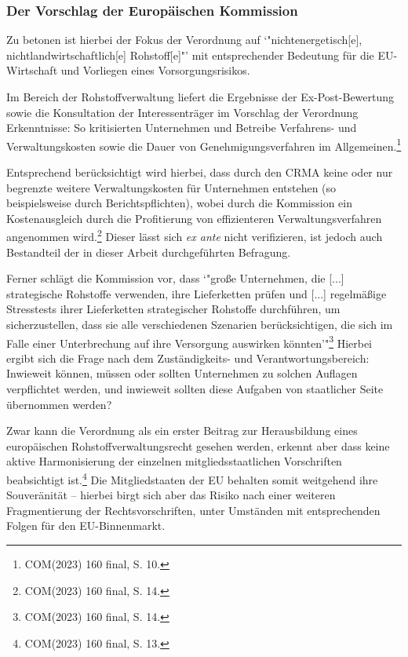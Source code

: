 \documentclass[12pt,a4paper,oneside]{book} %
\begin{document}
{	\subsubsection{Der Vorschlag der Europäischen Kommission}
	
	Zu betonen ist hierbei der Fokus der Verordnung auf `"nichtenergetisch[e], nichtlandwirtschaftlich[e] Rohstoff[e]"' mit entsprechender Bedeutung für die EU-Wirtschaft und Vorliegen eines Vorsorgungsrisikos.
	
	Im Bereich der Rohstoffverwaltung liefert die Ergebnisse der Ex-Post-Bewertung sowie die Konsultation der Interessenträger im Vorschlag der Verordnung Erkenntnisse: So kritisierten Unternehmen und Betreibe Verfahrens- und Verwaltungskosten sowie die Dauer von Genehmigungsverfahren im Allgemeinen.\footnote{COM(2023) 160 final, S. 10.}
	
	Entsprechend berücksichtigt wird hierbei, dass durch den CRMA keine oder nur begrenzte weitere Verwaltungskosten für Unternehmen entstehen (so beispielsweise durch Berichtspflichten), wobei durch die Kommission ein Kostenausgleich durch die Profitierung von effizienteren Verwaltungsverfahren angenommen wird.\footnote{COM(2023) 160 final, S. 14.} Dieser lässt sich \textit{ex ante} nicht verifizieren, ist jedoch auch Bestandteil der in dieser Arbeit durchgeführten Befragung. %
	
	Ferner schlägt die Kommission vor, dass `"große Unternehmen, die [...] strategische Rohstoffe verwenden, ihre Lieferketten prüfen und [...] regelmäßige Stresstests ihrer Lieferketten strategischer Rohstoffe durchführen, um sicherzustellen, dass sie alle verschiedenen Szenarien berücksichtigen, die sich im Falle einer Unterbrechung auf ihre Versorgung auswirken
	könnten'"\footnote{COM(2023) 160 final, S. 14.} Hierbei ergibt sich die Frage nach dem Zuständigkeits- und Verantwortungsbereich: Inwieweit können, müssen oder sollten Unternehmen zu solchen Auflagen verpflichtet werden, und inwieweit sollten diese Aufgaben von staatlicher Seite übernommen werden?
	
	Zwar kann die Verordnung als ein erster Beitrag zur Herausbildung eines europäischen Rohstoffverwaltungsrecht gesehen werden, erkennt aber dass keine aktive Harmonisierung der einzelnen mitgliedsstaatlichen Vorschriften beabsichtigt ist.\footnote{COM(2023) 160 final, S. 13.} Die Mitgliedstaaten der EU behalten somit weitgehend ihre Souveränität -- hierbei birgt sich aber das Risiko nach einer weiteren Fragmentierung der Rechtsvorschriften, unter Umständen mit entsprechenden Folgen für den EU-Binnenmarkt.
	
}
\end{document}
